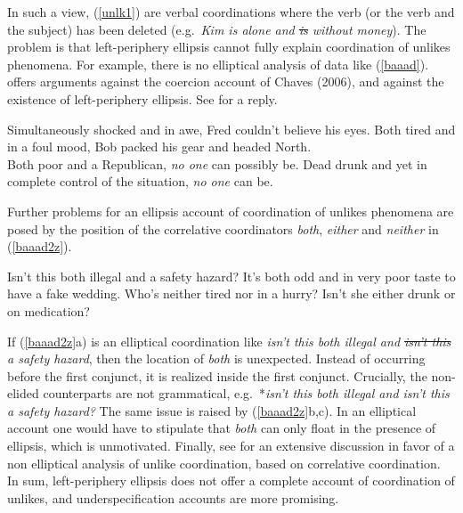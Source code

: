 \documentclass[output=paper
                ,modfonts
                ,nonflat
	        ,collection
	        ,collectionchapter
	        ,collectiontoclongg
 	        ,biblatex
                ,babelshorthands
                ,newtxmath
                ,draftmode
                ,colorlinks, citecolor=brown
]{./langsci/langscibook}
\begin{document}
\noindent
In such a view, (\ref{unlk1})  are verbal coordinations where the verb (or the verb and the subject) has been deleted  (e.g.\ \emph{Kim is alone and \sout{is} without money}).  The problem is that  left-periphery ellipsis  cannot  fully explain 
coordination of unlikes phenomena. For example, there is no elliptical analysis of  data like (\ref{baaad}). \citet{levine11} offers  arguments against
the coercion account of Chaves (2006),
and against  the existence of left-periphery ellipsis. See \cite{yatabe12} for a reply.


\begin{exe}
\ex
\begin{xlista}
\ex Simultaneously shocked and in awe, Fred couldn't believe his eyes.
\ex  Both tired and in a foul mood, Bob packed his gear and headed North.\\
\citep{chaves06}
\ex Both poor and a Republican, \emph{no one} can possibly be.
\ex  Dead drunk and yet in complete control of the situation, \emph{no one} can be.\\
\citep{levine11}
\end{xlista}\label{baaad}
\end{exe}



\noindent
Further problems for an  ellipsis account of coordination
of unlikes phenomena are posed by the position of  the 
correlative coordinators \emph{both}, \emph{either} and
 \emph{neither} in (\ref{baaad2z}).

\begin{exe}
\ex
\begin{xlista}
\ex Isn't this both illegal and a safety hazard?
\ex It's both odd and in very poor taste to have a fake wedding.
\ex Who's neither tired nor in a hurry?
\ex Isn't she either drunk or on medication?
\end{xlista}\label{baaad2z}
\end{exe}



\noindent
 If (\ref{baaad2z}a) is an elliptical coordination
like \emph{isn't this both illegal and \sout{isn't this} a safety
hazard}, then the location of \emph{both} is unexpected. Instead of
occurring before the first conjunct, it is realized inside the first
conjunct. Crucially, the non-elided counterparts are not
grammatical, e.g.\ *\emph{isn't this both illegal and isn't this a
safety hazard?} The same issue is raised by (\ref{baaad2z}b,c). In
an elliptical account  one would have to stipulate
that \emph{both} can only float in the presence of ellipsis, which
is unmotivated.
Finally, see \citet{Mouret:07} for  an extensive discussion in favor of a non elliptical analysis of unlike coordination, based on correlative coordination.
In sum, left-periphery ellipsis does not 
offer a complete account of coordination of unlikes, and underspecification
accounts are more promising.
\end{document}
